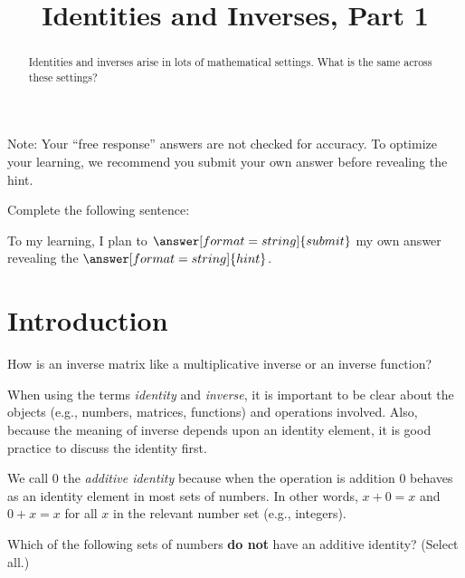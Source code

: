 \documentclass[space,nooutcomes]{ximera}
\title{Identities and Inverses, Part 1}
\begin{document}
\begin{abstract}
Identities and inverses arise in lots of mathematical
settings.  What is the same across these settings?  
\end{abstract}
\maketitle


\begin{question}
Note:  Your ``free response'' answers are not checked for accuracy.  To optimize your learning, we recommend you submit your own answer before revealing the hint.  

Complete the following sentence: 

To  my learning, I plan to $\answer[format=string]{submit}$ my own answer  revealing the $\answer[format=string]{hint}$.  
\end{question}

\section*{Introduction}
How is an inverse matrix like a multiplicative inverse or an inverse function?  

When using the terms \emph{identity} and \emph{inverse}, it is
important to be clear about the objects (e.g., numbers, matrices,
functions) and operations involved.  Also, because the meaning of
inverse depends upon an identity element, it is good practice to
discuss the identity first.

\begin{definition}
We call $0$ the \emph{additive identity} because when the operation is addition 
$0$ behaves as an identity element in most sets of numbers.  
In other words, $x+0=x$ and $0+x=x$ for all $x$ in the relevant number
set (e.g., integers).
\end{definition}

\begin{question}
Which of the following sets of numbers \textbf{do not} have an additive identity?  (Select all.)
\begin{selectAll}
\end{selectAll}
\end{question}
\end{document}
